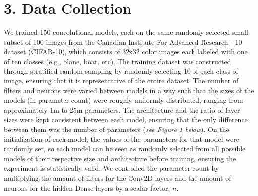 \documentclass[12pt]{article}
\begin{document}
    \section*{3. Data Collection}

    We trained 150 convolutional models, each on the same randomly selected small subset of 100 images
    from the Canadian Institute For Advanced Research - 10 dataset (CIFAR-10), which consists of 32x32 color images each labeled with one of ten classes (e.g., plane, boat, etc).
    The training dataset was constructed through stratified random sampling by randomly selecting 10 of each class of image, ensuring that it is representative of the entire dataset.
    The number of filters and neurons were varied between models in a way such that the sizes of the models (in parameter count) were roughly uniformly distributed, ranging from approximately 1m to 25m parameters.
    The architecture and the ratio of layer sizes were kept consistent between each model, ensuring that the only difference between them was the number of parameters (\textit{see Figure 1 below}).
    On the initialization of each model, the values of the parameters for that model were randomly set, so each model can be seen as randomly
    selected from all possible models of their respective size and architecture before training, ensuring the experiment is statistically valid.
    We controlled the parameter count by multiplying the amount of filters for the Conv2D layers and the amount of neurons
    for the hidden Dense layers by a scalar factor, $n$.
\end{document}
